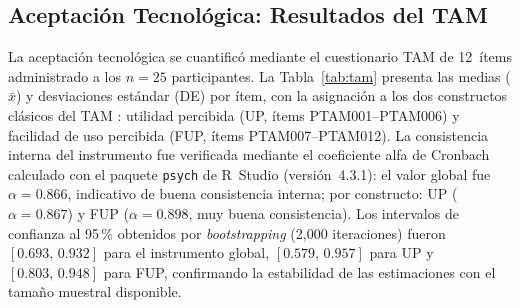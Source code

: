 \documentclass[journal]{IEEEtran}
\begin{document}
	\subsection{Aceptaci\'on Tecnol\'ogica: Resultados del TAM}
	La aceptaci\'on tecnol\'ogica se cuantific\'o mediante el cuestionario TAM de 12~\'items administrado a los $n=25$ participantes. La Tabla~\ref{tab:tam} presenta las medias ($\bar{x}$) y desviaciones est\'andar (DE) por \'item, con la asignaci\'on a los dos constructos cl\'asicos del TAM \cite{davis1989}: utilidad percibida (UP, \'items PTAM001--PTAM006) y facilidad de uso percibida (FUP, \'items PTAM007--PTAM012). La consistencia interna del instrumento fue verificada mediante el coeficiente alfa de Cronbach calculado con el paquete \texttt{psych} de R~Studio (versi\'on~4.3.1): el valor global fue $\alpha = 0.866$, indicativo de buena consistencia interna; por constructo: UP ($\alpha = 0.867$) y FUP ($\alpha = 0.898$, muy buena consistencia). Los intervalos de confianza al 95\,\% obtenidos por \textit{bootstrapping} (2{,}000 iteraciones) fueron $[0.693,\,0.932]$ para el instrumento global, $[0.579,\,0.957]$ para UP y $[0.803,\,0.948]$ para FUP, confirmando la estabilidad de las estimaciones con el tama\~no muestral disponible.
	
\end{document}

